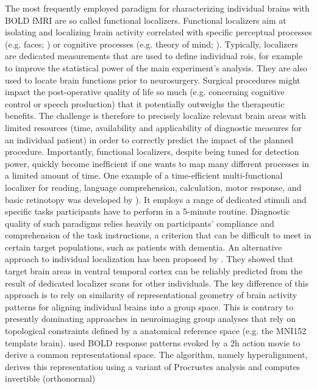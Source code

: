 %
The most frequently employed paradigm for characterizing individual brains with
BOLD fMRI are so called functional localizers.
%
Functional localizers aim at isolating and localizing brain activity correlated
with specific perceptual processes (e.g. faces; \citep{kanwisher1997ffa}) or
cognitive processes (e.g. theory of mind; \citep{spunt2014validating}).
%
Typically, localizers are dedicated measurements that are used to define
individual \acp{roi}, for example to improve the statistical power of the main
experiment's analysis. They are also used to locate brain functions prior to
neurosurgery.
%
Surgical procedures might impact the post-operative quality of life so much
(e.g. concerning cognitive control or speech production) that it potentially
outweighs the therapeutic benefits.  The challenge is therefore to precisely
localize relevant brain areas with limited resources (time, availability and
applicability of diagnostic measures for an individual patient) in order to
correctly predict the impact of the planned procedure.
%
Importantly, functional localizers, despite being tuned for detection power,
quickly become inefﬁcient if one wants to map many different processes in a
limited amount of time.
%
One example of a time-efficient multi-functional localizer for reading, language
comprehension, calculation, motor response, and basic retinotopy was developed
by \citep{pinel2007fast}).
%
It employs a range of dedicated stimuli and specific tasks participants have to
perform in a 5-minute routine.
%
Diagnostic quality of such paradigms relies heavily on participants' compliance
and comprehension of the task instructions, a criterion that can be difficult to
meet in certain target populations, such as patients with dementia.
%
An alternative approach to individual localization has been proposed by
\citet{haxby2011common}.  They showed that target brain areas in ventral
temporal cortex can be reliably predicted from the result of dedicated localizer
scans for other individuals.
%
The key difference of this approach is to rely on similarity of representational
geometry of brain activity patterns for aligning individual brains into a group
space.
%
This is contrary to presently dominating approaches in neuroimaging group
analyses that rely on topological constraints defined by a anatomical reference
space (e.g. the MNI152 template brain).
%
\citet{haxby2011common} used BOLD response patterns evoked by a 2h action movie
to derive a common representational space.
%
The algorithm, namely hyperalignment, derives this representation using a
variant of Procrustes analysis and computes invertible (orthonormal)

